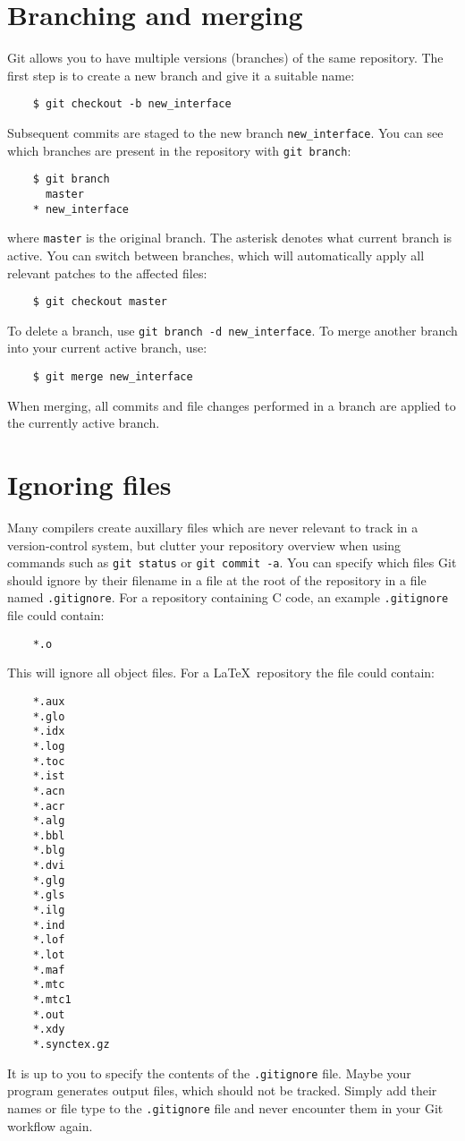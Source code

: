 \documentclass[11pt]{article}
\begin{document}
\section{Branching and merging}
Git allows you to have multiple versions (branches) of the same repository.  The 
first step is to create a new branch and give it a suitable name:
\begin{lstlisting}
    $ git checkout -b new_interface
\end{lstlisting}
Subsequent commits are staged to the new branch \texttt{new\_interface}.  You 
can see which branches are present in the repository with \texttt{git branch}:
\begin{lstlisting}
    $ git branch
      master
    * new_interface
\end{lstlisting}
where \texttt{master} is the original branch.  The asterisk denotes what current 
branch is active.  You can switch between branches, which will automatically 
apply all relevant patches to the affected files:
\begin{lstlisting}
    $ git checkout master
\end{lstlisting}
To delete a branch, use \texttt{git branch -d new\_interface}.  To merge another 
branch into your current active branch, use:
\begin{lstlisting}
    $ git merge new_interface
\end{lstlisting}
When merging, all commits and file changes performed in a branch are applied to 
the currently active branch.

\section{Ignoring files}
Many compilers create auxillary files which are never relevant to track in a 
version-control system, but clutter your repository overview when using commands 
such as \texttt{git status} or \texttt{git commit -a}.  You can specify which 
files Git should ignore by their filename in a file at the root of the 
repository in a file named \texttt{.gitignore}.
For a repository containing C code, an example \texttt{.gitignore} file could 
contain:
\begin{lstlisting}
    *.o
\end{lstlisting}
This will ignore all object files.  For a \LaTeX~repository the file could 
contain:
\begin{lstlisting}
    *.aux
    *.glo
    *.idx
    *.log
    *.toc
    *.ist
    *.acn
    *.acr
    *.alg
    *.bbl
    *.blg
    *.dvi
    *.glg
    *.gls
    *.ilg
    *.ind
    *.lof
    *.lot
    *.maf
    *.mtc
    *.mtc1
    *.out
    *.xdy
    *.synctex.gz
\end{lstlisting}
It is up to you to specify the contents of the \texttt{.gitignore} file.  Maybe 
your program generates output files, which should not be tracked. Simply add 
their names or file type to the \texttt{.gitignore} file and never encounter 
them in your Git workflow again.
\end{document}
